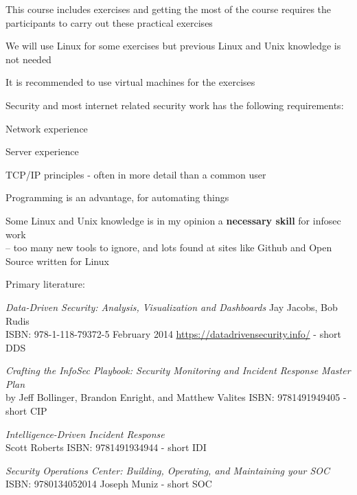 \documentclass[Screen16to9,17pt]{foils}
\begin{document}
\begin{list1}
\item This course includes exercises and getting the most of the course requires the participants to carry out these practical exercises
\item We will use Linux for some exercises but previous Linux and Unix knowledge is not needed
\item It is recommended to use virtual machines for the exercises
\item Security and most internet related security work has the following requirements:
\begin{list2}
\item Network experience
\item Server experience
\item TCP/IP principles - often in more detail than a common user
\item Programming is an advantage, for automating things
\item Some Linux and Unix knowledge is in my opinion a {\bf necessary skill} for infosec work\\
-- too many new tools to ignore, and lots found at sites like Github and Open Source written for Linux
\end{list2}
\end{list1}



Primary literature:
\begin{list2}
\item \emph{Data-Driven Security: Analysis, Visualization and Dashboards} Jay Jacobs, Bob Rudis\\
ISBN: 978-1-118-79372-5 February 2014 \url{https://datadrivensecurity.info/} - short DDS
\item \emph{Crafting the InfoSec Playbook: Security Monitoring and Incident Response Master Plan}\\
 by Jeff Bollinger, Brandon Enright, and Matthew Valites ISBN: 9781491949405 - short CIP
\item \emph{Intelligence-Driven Incident Response} \\
 Scott Roberts ISBN: 9781491934944 - short IDI
\item \emph{Security Operations Center: Building, Operating, and Maintaining your SOC}\\
ISBN: 9780134052014 Joseph Muniz - short SOC
\end{list2}
\end{document}
